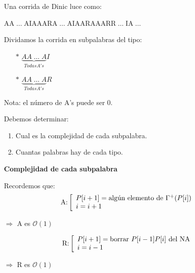 \documentclass[12pt,a4paper]{report}
\begin{document}
		Una corrida de Dinic luce como:
		\begin{center}
			AA$\; \dotsc \;$AIAAARA$\; \dotsc \;$AIAARAAARR$\; \dotsc \;$IA$\; \dotsc \;$
		\end{center}
		
		Dividamos la corrida en subpalabras del tipo:
		\begin{center}
			\begin{itemize}
				\item[$*$] $\underbrace{AA \; \dotsc \; A}_{Todas A's}I$
				\item[$*$] $\underbrace{AA \; \dotsc \; A}_{Todas A's}R$
			\end{itemize}
		\end{center}
		
		Nota: el número de A's puede ser 0.
		
		Debemos determinar:
		\begin{enumerate}
			\item Cual es la complejidad de cada subpalabra.
			\item Cuantas palabras hay de cada tipo.
		\end{enumerate}
		
		\textbf{Complejidad de cada subpalabra}
		
		Recordemos que:
		\begin{equation*}
			\textup{A:}
  			\left[
  			\begin{array}{l}
    		 P[i+1] = \textup{algún elemento de } \Gamma^{+}(P[i]) \\
     		 i = i+1\\
  			\end{array}
  			\right.
		\end{equation*}
		\begin{center}
			$\Rightarrow$ A es $\mathcal{O}(1)$
		\end{center}
		
		\begin{equation*}
			\textup{R:}
  			\left[
  			\begin{array}{l}
    		 P[i+1] = \textup{borrar } P[i-1]P[i] \textup{ del NA} \\
     		 i = i-1\\
  			\end{array}
  			\right.
		\end{equation*}
		\begin{center}
			$\Rightarrow$ R es $\mathcal{O}(1)$
		\end{center}
		
\end{document}

